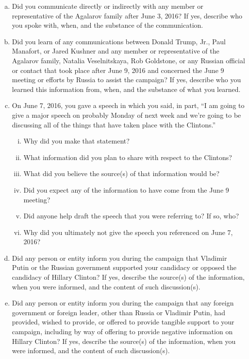 \begin{enumerate}[a.]
\item Did you communicate directly or indirectly with any member or representative of the Agalarov family after June 3, 2016?
If yes, describe who you spoke with, when, and the substance of the communication.

\item Did you learn of any communications between Donald Trump, Jr., Paul Manafort, or Jared Kushner and any member or representative of the Agalarov family, Natalia Veselnitskaya, Rob Goldstone, or any Russian official or contact that took place after June 9, 2016 and concerned the June 9 meeting or efforts by Russia to assist the campaign?
If yes, describe who you learned this information from, when, and the substance of what you learned.

\item On June 7, 2016, you gave a speech in which you said, in part, “I am going to give a major speech on probably Monday of next week and we’re going to be discussing all of the things that have taken place with the Clintons.”

\begin{enumerate}[i.]

\item Why did you make that statement?
\item What information did you plan to share with respect to the Clintons?
\item What did you believe the source(s) of that information would be?
\item Did you expect any of the information to have come from the June 9 meeting?
\item Did anyone help draft the speech that you were referring to? If so, who?
\item Why did you ultimately not give the speech you referenced on June 7, 2016?

\end{enumerate}

\item Did any person or entity inform you during the campaign that Vladimir Putin or the Russian government supported your candidacy or opposed the candidacy of Hillary Clinton?
If yes, describe the source(s) of the information, when you were informed, and the content of such discussion(s).

\item Did any person or entity inform you during the campaign that any foreign government or foreign leader, other than Russia or Vladimir Putin, had provided, wished to provide, or offered to provide tangible support to your campaign, including by way of offering to provide negative information on Hillary Clinton?
If yes, describe the source(s) of the information, when you were informed, and the content of such discussion(s).

\end{enumerate}

